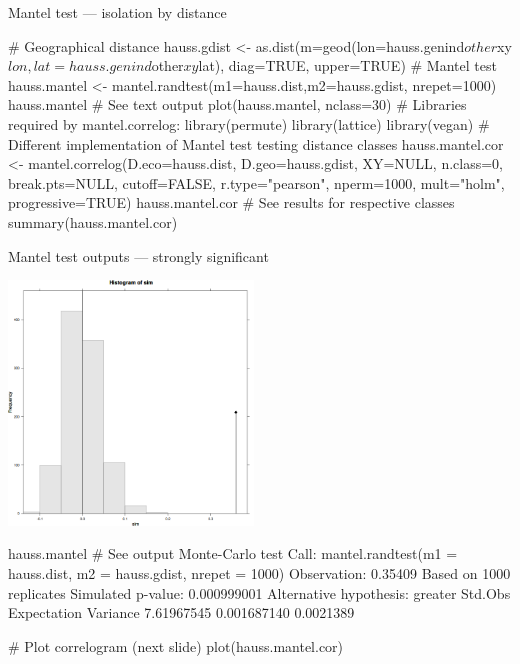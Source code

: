 \documentclass[compress, xelatex, 11pt, xcolor=svgnames, aspectratio=169,
	hyperref={
		bookmarks=true,
		unicode=true,
		colorlinks=true,
		pdftitle={Molecular data in R},
		plainpages=false,
		pdfauthor={Vojtech Zeisek},
		pdfsubject={Course about phylogeny and evolution in R},
		pdfcreator={XeLaTeX},
		pdfkeywords={R, evolution, phylogeny, molecular data},
		linkcolor=Crimson, %
		anchorcolor=Magenta, %
		citecolor=Magenta, %
		filecolor=Magenta, %
		menucolor=Magenta, %
		urlcolor=DodgerBlue, %
		},
	url={hyphens, lowtilde} %
	]{beamer}
\begin{document}
\begin{frame}[fragile]{Mantel test --- isolation by distance}
	\begin{spluscode}
    # Geographical distance
    hauss.gdist <- as.dist(m=geod(lon=hauss.genind$other$xy$lon,
      lat=hauss.genind$other$xy$lat), diag=TRUE, upper=TRUE)
    # Mantel test
    hauss.mantel <- mantel.randtest(m1=hauss.dist,m2=hauss.gdist, nrepet=1000)
    hauss.mantel # See text output
    plot(hauss.mantel, nclass=30)
    # Libraries required by mantel.correlog:
    library(permute)
    library(lattice)
    library(vegan)
    # Different implementation of Mantel test testing distance classes
    hauss.mantel.cor <- mantel.correlog(D.eco=hauss.dist, D.geo=hauss.gdist,
      XY=NULL, n.class=0, break.pts=NULL, cutoff=FALSE, r.type="pearson",
      nperm=1000, mult="holm", progressive=TRUE)
    hauss.mantel.cor # See results for respective classes
    summary(hauss.mantel.cor)
	\end{spluscode}
\end{frame}

\begin{frame}[fragile]{Mantel test outputs --- strongly significant}
	\begin{multicols}{2}
		\begin{center}
			\includegraphics[height=6.5cm]{mantel.png}
		\end{center}
		\columnbreak
		\begin{spluscode}
    hauss.mantel # See output
    Monte-Carlo test
    Call: mantel.randtest(m1 =
      hauss.dist, m2 =
      hauss.gdist, nrepet = 1000)
    Observation: 0.35409
    Based on 1000 replicates
    Simulated p-value: 0.000999001
    Alternative hypothesis: greater
       Std.Obs Expectation  Variance
    7.61967545 0.001687140 0.0021389
		\end{spluscode}
		\vfill
		\begin{spluscode}
    # Plot correlogram (next slide)
    plot(hauss.mantel.cor)
		\end{spluscode}
		\vfill
	\end{multicols}
\end{frame}
\end{document}
